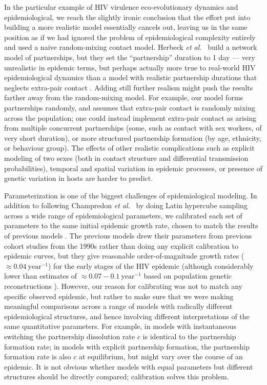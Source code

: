 \documentclass[10pt,letterpaper]{article}
\newcommand{\etal}{\textit{et al.}}
\begin{document}
In the particular example of HIV virulence eco-evolutionary dynamics
and epidemiological, we reach the slightly ironic conclusion that the
effort put into building a more realistic model essentially cancels
out, leaving us in the same position as if we had ignored the problem
of epidemiological complexity entirely and used a naive random-mixing
contact model. Herbeck \etal\ \cite{herbeck_hiv_2014} build a
network model of partnerships, but they set the ``partnership''
duration to 1 day --- very unrealistic in epidemic terms, but perhaps
actually more true to real-world HIV epidemiological dynamics than a
model with realistic partnership durations that neglects extra-pair
contact \cite{herbeck2016evolution}. Adding still further realism
might push the results farther away from the random-mixing model. For
example, our model forms partnerships randomly, and assumes that
extra-pair contact is randomly mixing across the population;
one could instead implement extra-pair contact as arising from
multiple concurrent partnerships (some, such as contact with sex
workers, of very short duration), or more structured partnership
formation (by age, ethnicity, or behaviour group). The effects of
other realistic complications such as explicit modeling of two
sexes (both in contact structure and differential transmission
probabilities), temporal and spatial variation in epidemic processes,
or presence of genetic variation in hosts are harder to predict.

Parameterization is one of the biggest challenges of epidemiological
modeling. In addition to following Champredon \etal\ \cite{champredon_hiv_2013} 
by doing Latin hypercube
sampling across a wide range of epidemiological parameters, we 
calibrated each set of parameters to the same initial epidemic
growth rate, chosen to match the results of previous models
\cite{shirreff_transmission_2011}.  The previous models drew their
parameters from previous cohort studies from the 1990s
\cite{wawer2005rates,hollingsworth_hiv1_2008}
rather than doing any explicit calibration to epidemic curves,
but they give reasonable order-of-magnitude
growth rates ($\approx 0.04~\textrm{year}^{-1}$)
for the early stages of the HIV epidemic (although considerably
lower than estimates of $\approx 0.07-0.1~\textrm{year}^{-1}$
based on population genetic reconstructions \cite{faria_early_2014}).
However, our reason for calibrating was not to match any
specific observed epidemic, but rather to make sure that
we were making meaningful comparisons across a range of
models with radically different epidemiological structures, and
hence involving different interpretations of the same quantitative
parameters.  For example, in models with instantaneous switching the
partnership dissolution rate $c$ is identical to the partnership
formation rate; in models with explicit partnership formation,
the partnership formation rate is also $c$ at equilibrium,
but might vary over the course of an epidemic.
It is not obvious whether models with equal parameters but
different structures should be directly compared; calibration
solves this problem.
\end{document}
